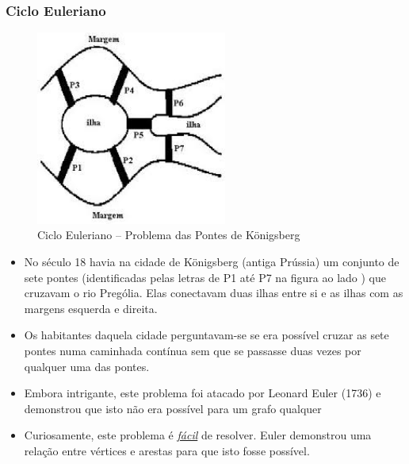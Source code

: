 \begin{frame}[fragile, allowframebreaks=0.9]
  \frametitle{Ciclo Euleriano}

\begin{figure}[!htb]
\centering
\includegraphics[width=0.560\textwidth, height=0.50\textheight]{figures/ilhas_euler.jpeg}
\caption{Ciclo Euleriano -- Problema das Pontes de Königsberg}
\end{figure}


\framebreak

\begin{itemize}
  \item No século 18 havia na cidade de Königsberg (antiga Prússia)  um conjunto de sete pontes
 (identificadas pelas letras de P1 até P7 na figura ao lado ) que cruzavam o rio  Prególia. 
 Elas conectavam duas ilhas  entre si e as ilhas com as margens esquerda
 e direita.
 
\item Os habitantes daquela cidade perguntavam-se se era possível cruzar 
as sete pontes numa caminhada contínua sem que se passasse duas vezes por 
qualquer uma das pontes.

\item  Embora intrigante, este problema foi atacado por Leonard Euler (1736) e demonstrou
que isto não era possível para um grafo qualquer

\item Curiosamente, este problema é \underline{\textit{fácil}} de resolver. Euler demonstrou
uma relação entre vértices e arestas para que isto fosse possível.
\end{itemize}

\end{frame}




